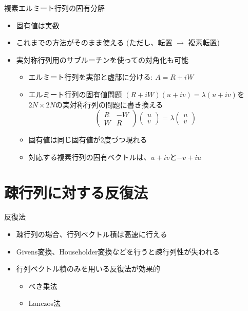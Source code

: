 \documentclass[dvipdfmx]{beamer}
\begin{document}
\begin{frame}[t,fragile]{複素エルミート行列の固有分解}
  \begin{itemize}
  \item 固有値は実数
  \item これまでの方法がそのまま使える (ただし、転置 $\rightarrow$ 複素転置)
  \item 実対称行列用のサブルーチンを使っての対角化も可能
    \begin{itemize}
    \item エルミート行列を実部と虚部に分ける: $A = R + iW$
    \item エルミート行列の固有値問題 $(R + iW)(u+iv) = \lambda(u+iv)$を$2N \times 2N$の実対称行列の問題に書き換える
      \[
      \begin{pmatrix} R & -W \\ W & R \end{pmatrix}
      \begin{pmatrix} u \\ v \end{pmatrix}
      = 
      \lambda \begin{pmatrix} u \\ v \end{pmatrix}
      \]
    \item 固有値は同じ固有値が2度づつ現れる
    \item 対応する複素行列の固有ベクトルは、$u+iv$と$-v+iu$
    \end{itemize}
  \end{itemize}
\end{frame}

\section{疎行列に対する反復法}

\begin{frame}[t,fragile]{反復法}
  \begin{itemize}
    \setlength{\itemsep}{1em}
  \item 疎行列の場合、行列ベクトル積は高速に行える
  \item Givens変換、Householder変換などを行うと疎行列性が失われる
  \item 行列ベクトル積のみを用いる反復法が効果的
    \begin{itemize}
    \item べき乗法
    \item Lanczos法
    \end{itemize}
  \end{itemize}
\end{frame}
\end{document}
